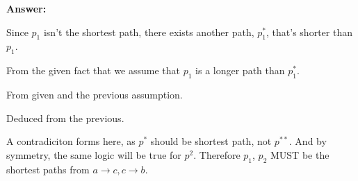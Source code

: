 \documentclass[11pt]{article}
\newenvironment{questions}
  {\begin{enumerate}}
  {\end{enumerate}}
\newenvironment{answer}
  {\vspace{0.5em}\noindent\textbf{Answer:}\par}
  {\vspace{1em}}
\newenvironment{answercols}
  {\begin{multicols}{2}}
  {\end{multicols}}
\begin{document}
\begin{questions}
\begin{answer}
\begin{answercols}
                Since $p_1$ isn’t the shortest path, there exists another path, $p_1^*$, that’s shorter than $p_1$.

                From the given fact that we assume that $p_1$ is a longer path than $p_1^*$.

                From given and the previous assumption.

                Deduced from the previous.
            \end{answercols}

            A contradiciton forms here, as $p^*$ should be shortest path, not $p^{**}$. And by symmetry, the same logic will be true for $p^2$. Therefore $p_1$, $p_2$ MUST be the shortest paths from $a \to c, c \to b$.
        \end{answer}
    \end{questions}

    \pagebreak
\end{document}
